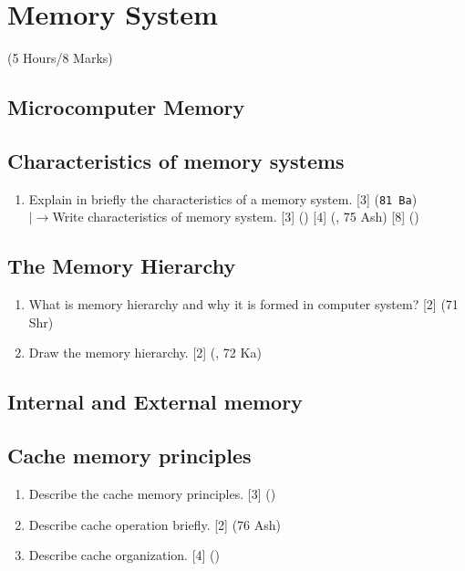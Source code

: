 \documentclass[12pt]{article}
\newcommand{\lb}{\\$\left|\rightarrow\right.$}
\begin{document}
\section{Memory System}
	\begin{center}(5 Hours/8 Marks)\end{center}
	\subsection{Microcomputer Memory}
	\subsection{Characteristics of memory systems}
		\begin{enumerate}
			\item Explain in briefly the characteristics of a memory system. \hfill [3] (\texttt{81 Ba})
			\lb Write characteristics of memory system. \hfill [3] () [4] (, 75 Ash) [8] ()
		\end{enumerate}

	\subsection{The Memory Hierarchy}
		\begin{enumerate}
			\item What is memory hierarchy and why it is formed in computer system? \hfill [2] (71 Shr)
			
			\item Draw the memory hierarchy. \hfill [2] (, 72 Ka)
		\end{enumerate}

	\subsection{Internal and External memory}
	\subsection{Cache memory principles}
		\begin{enumerate}
			\item Describe the cache memory principles. \hfill [3] ()

			\item Describe cache operation briefly. \hfill [2] (76 Ash)

			\item Describe cache organization. \hfill [4] ()
		\end{enumerate}
\end{document}
